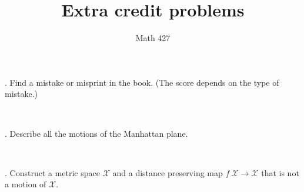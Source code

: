 \documentclass[oneside,a4paper]{article}
\begin{document}
\title{Extra credit problems}
\author{Math 427}
\date{}
\maketitle

\textit{}

. Find a mistake or misprint in the book.
(The score depends on the type of mistake.)

\ 

. Describe all the motions of the Manhattan plane.

\ 

. Construct a metric space $\mathcal X$ and a distance preserving map $f\:\mathcal X\to \mathcal X$ that is not a motion of $\mathcal X$.
\end{document}
